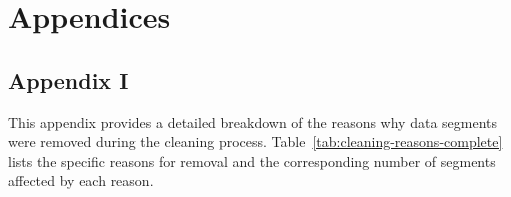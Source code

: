 \chapter*{Appendices}
\renewcommand{\thefigure}{A.\arabic{figure}}
\renewcommand{\thetable}{A.\arabic{table}}


\section*{Appendix I}
\label{app:1}

This appendix provides a detailed breakdown of the reasons why data segments were removed during the cleaning process. Table~\ref{tab:cleaning-reasons-complete} lists the specific reasons for removal and the corresponding number of segments affected by each reason.

